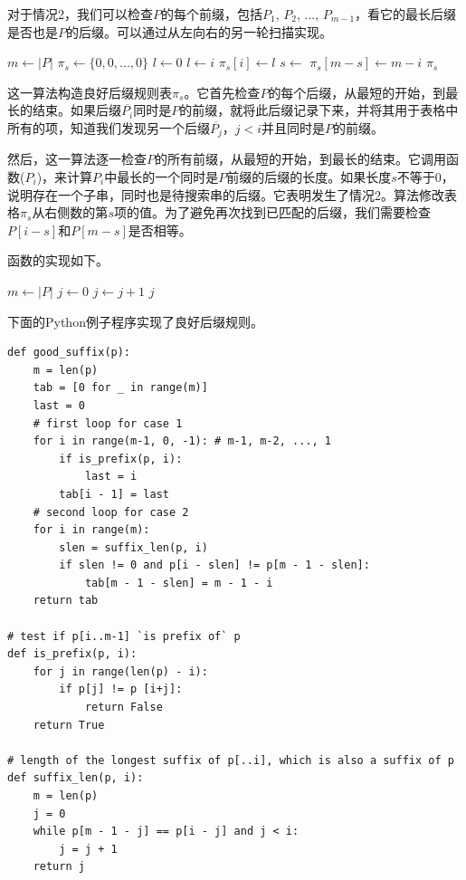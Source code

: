 \documentclass[UTF8]{article}
\begin{document}
对于情况2，我们可以检查$P$的每个前缀，包括$P_1$, $P_2$, ..., $P_{m-1}$，看它的最长后缀是否也是$P$的后缀。可以通过从左向右的另一轮扫描实现。

\begin{algorithmic}[1]
  \State $m \gets |P|$
  \State $\pi_s \gets \{0, 0, ..., 0\}$ 
  \State $l \gets 0$ 
   
     
      \State $l \gets i$
    \EndIf
    \State $\pi_s[i] \gets l$
  \EndFor
   
    \State $s \gets$ 
      \State $\pi_s[m - s] \gets m - i$
    \EndIf
  \EndFor
  \State \Return $\pi_s$
\EndFunction
\end{algorithmic}

这一算法构造良好后缀规则表$\pi_s$。它首先检查$P$的每个后缀，从最短的开始，到最长的结束。如果后缀$\overline{P_i}$同时是$P$的前缀，就将此后缀记录下来，并将其用于表格中所有的项，知道我们发现另一个后缀$\overline{P_j}$，$j < i$并且同时是$P$的前缀。

然后，这一算法逐一检查$P$的所有前缀，从最短的开始，到最长的结束。它调用函数($P_i$)，来计算$P_i$中最长的一个同时是$P$前缀的后缀的长度。如果长度$s$不等于0，说明存在一个子串，同时也是待搜索串的后缀。它表明发生了情况2。算法修改表格$\pi_s$从右侧数的第$s$项的值。为了避免再次找到已匹配的后缀，我们需要检查$P[i - s]$和$P[m - s]$是否相等。

函数的实现如下。

\begin{algorithmic}[1]
  \State $m \gets |P|$
  \State $j \gets 0$
    \State $j \gets j + 1$
  \EndWhile
  \State \Return $j$
\EndFunction
\end{algorithmic}

下面的Python例子程序实现了良好后缀规则。

\lstset{language=Python}
\begin{lstlisting}
def good_suffix(p):
    m = len(p)
    tab = [0 for _ in range(m)]
    last = 0
    # first loop for case 1
    for i in range(m-1, 0, -1): # m-1, m-2, ..., 1
        if is_prefix(p, i):
            last = i
        tab[i - 1] = last
    # second loop for case 2
    for i in range(m):
        slen = suffix_len(p, i)
        if slen != 0 and p[i - slen] != p[m - 1 - slen]:
            tab[m - 1 - slen] = m - 1 - i
    return tab

# test if p[i..m-1] `is prefix of` p
def is_prefix(p, i):
    for j in range(len(p) - i):
        if p[j] != p [i+j]:
            return False
    return True

# length of the longest suffix of p[..i], which is also a suffix of p
def suffix_len(p, i):
    m = len(p)
    j = 0
    while p[m - 1 - j] == p[i - j] and j < i:
        j = j + 1
    return j
\end{lstlisting}
\end{document}
